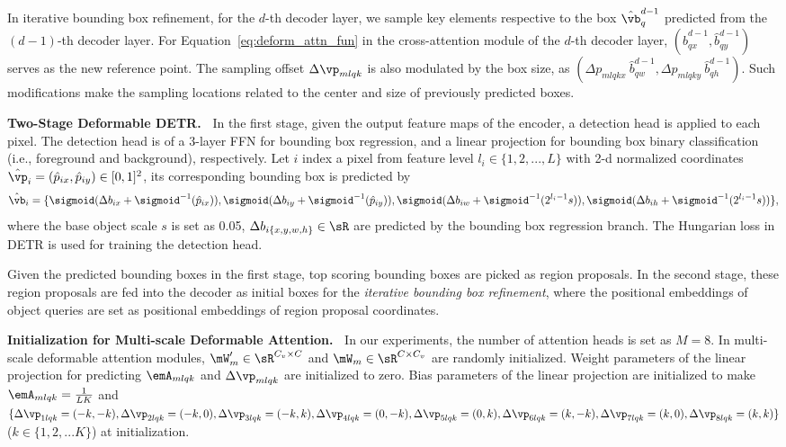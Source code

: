 In iterative bounding box refinement, for the $d$-th decoder layer, we sample key elements respective to the box $\hat{\vb}_q^{d-1}$ predicted from the $(d-1)$-th decoder layer. For Equation~\ref{eq:deform_attn_fun} in the cross-attention module of the $d$-th decoder layer, $(\hat{b}^{d-1}_{qx}, \hat{b}^{d-1}_{qy})$ serves as the new reference point. The sampling offset $\Delta\vp_{mlqk}$ is also modulated by the box size, as $({\Delta p_{mlqkx}~\hat{b}^{d-1}_{qw}}, \Delta p_{mlqky}~\hat{b}^{d-1}_{qh})$.
Such modifications make the sampling locations related to the center and size of previously predicted boxes.

\textbf{Two-Stage Deformable DETR.~}
In the first stage, given the output feature maps of the encoder, a detection head is applied to each pixel. 
The detection head is of a 3-layer FFN for bounding box regression, and a linear projection for bounding box binary classification (i.e., foreground and background), respectively.
Let $i$ index a pixel from feature level $l_i \in \{1, 2, ..., L\}$ with 2-d normalized coordinates $\hat{\vp}_i = (\hat{p}_{ix}, \hat{p}_{iy}) \in [0,1]^2$, its corresponding bounding box is predicted by
\begin{equation*}
\hat{\vb}_i = \{\sigmoid(\Delta b_{ix} + \sigmoid^{-1}(\hat{p}_{ix})), \sigmoid(\Delta b_{iy} + \sigmoid^{-1}(\hat{p}_{iy})), \sigmoid(\Delta b_{iw} + \sigmoid^{-1}(2^{l_i - 1}s)), \sigmoid(\Delta b_{ih} + \sigmoid^{-1}(2^{l_i - 1}s))\},
\end{equation*}
where the base object scale $s$ is set as 0.05, $\Delta b_{i\{x,y,w,h\}} \in \sR$ are predicted by the bounding box regression branch. The Hungarian loss in DETR is used for training the detection head.

Given the predicted bounding boxes in the first stage, top scoring bounding boxes are picked as region proposals. In the second stage, these region proposals are fed into the decoder as initial boxes for the \textit{iterative bounding box refinement}, where the positional embeddings of object queries are set as positional embeddings of region proposal coordinates.


\textbf{Initialization for Multi-scale Deformable Attention.~}
In our experiments, the number of attention heads is set as $M = 8$.
In multi-scale deformable attention modules, $\mW'_m \in \sR^{C_v \times C}$ and $\mW_m \in \sR^{C \times C_v}$ are randomly initialized.
Weight parameters of the linear projection for predicting $\emA_{mlqk}$ and $\Delta\vp_{mlqk}$ are initialized to zero. 
Bias parameters of the linear projection are initialized to make $\emA_{mlqk} = \frac{1}{LK}$ and $\{\Delta\vp_{1lqk} = (-k, -k), \Delta\vp_{2lqk} = (-k, 0), \Delta\vp_{3lqk} = (-k, k), \Delta\vp_{4lqk} = (0, -k), \Delta\vp_{5lqk} = (0, k), \Delta\vp_{6lqk} = (k, -k), \Delta\vp_{7lqk} = (k, 0), \Delta\vp_{8lqk} = (k, k)\}$ ($k \in \{1, 2, ... K\}$) at initialization.

